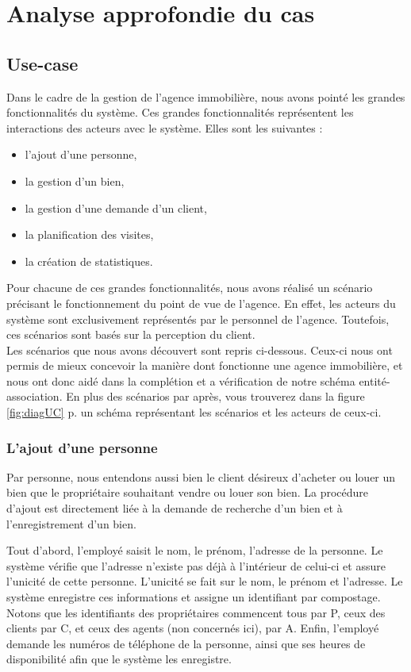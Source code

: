 \section{Analyse approfondie du cas}

\subsection{Use-case}
Dans le cadre de la gestion de l'agence immobilière, nous avons pointé les grandes fonctionnalités du système. Ces grandes fonctionnalités représentent les interactions des acteurs avec le système.
Elles sont les suivantes :
\begin{itemize}
	\item l'ajout d'une personne,
	\item la gestion d'un bien,
	\item la gestion d'une demande d'un client,
	\item la planification des visites,
	\item la création de statistiques.
\end{itemize}
Pour chacune de ces grandes fonctionnalités, nous avons réalisé un scénario précisant le fonctionnement du point de vue de l'agence. En effet, les acteurs du système sont exclusivement représentés par le personnel de l'agence.
Toutefois, ces scénarios sont basés sur la perception du client.\\

Les scénarios que nous avons découvert sont repris ci-dessous. Ceux-ci nous ont permis de mieux concevoir la manière dont fonctionne une agence immobilière, et nous ont donc aidé dans la complétion et a vérification de notre schéma entité-association. En plus des scénarios par après, vous trouverez dans la figure \ref{fig:diagUC} p.\pageref{fig:diagUC} un schéma représentant les scénarios et les acteurs de ceux-ci.

\subsubsection{L'ajout d'une personne}
Par personne, nous entendons aussi bien le client désireux d'acheter ou louer un bien que le propriétaire souhaitant vendre ou louer son bien.
La procédure d'ajout est directement liée à la demande de recherche d'un bien et à l'enregistrement d'un bien.

Tout d'abord, l'employé saisit le nom, le prénom, l'adresse de la personne.
Le système vérifie que l'adresse n'existe pas déjà à l'intérieur de celui-ci et assure l'unicité de cette personne. L'unicité se fait sur le nom, le prénom et l'adresse.
Le système enregistre ces informations et assigne un identifiant par compostage. Notons que les identifiants des propriétaires commencent tous par P, ceux des clients par C, et ceux des agents (non concernés ici), par A.
Enfin, l'employé demande les numéros de téléphone de la personne, ainsi que ses heures de disponibilité afin que le système les enregistre.

